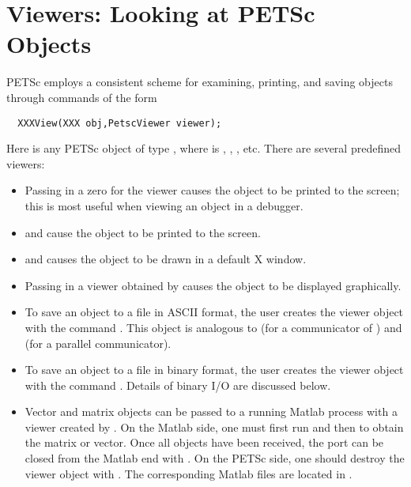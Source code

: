 \section{Viewers: Looking at PETSc Objects} \label{sec:viewers}

PETSc employs a consistent scheme for examining, printing, and 
saving objects through commands of the form
\begin{verbatim}
  XXXView(XXX obj,PetscViewer viewer);
\end{verbatim}
Here  is any PETSc object of type
,  where  
is , , , etc. There are several
predefined viewers:
\begin{itemize}
\item Passing in a zero for the viewer causes the object to be printed 
      to the screen; this is most useful when viewing an object in 
      a debugger.
\item {}  and 
       
      cause the object to be printed to the screen.

\item {}  and 
        causes the 
      object to be drawn in a default X window.
\item Passing in a viewer obtained by
       causes the object to be displayed graphically.
\item To save an object to a file in ASCII format, the user creates
      the viewer object with the command
      .  
      This object is 
      analogous to  (for a communicator of
      ) and 
       (for a parallel communicator).
\item To save an object to a file in binary format, the user creates
      the viewer object with the command
        .   Details of binary
      I/O are discussed below.
\item Vector and matrix objects can be passed to a running Matlab process
      with a viewer created by .  
      On the Matlab side, one must first run 
      and then  to obtain the matrix or vector. Once all
      objects have been received, the port can be closed from the Matlab end
      with . On the PETSc side, one should destroy
      the viewer object with  . The corresponding Matlab 
      files are located in .
\end{itemize}

